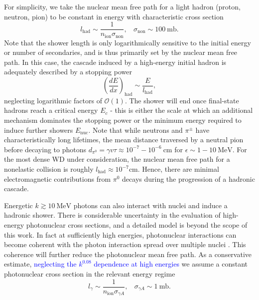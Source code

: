 \documentclass[twocolumn,showpacs,preprintnumbers,amsmath,amssymb,prd]{revtex4}
\newcommand{\OO}{\mathcal{O}}
\def\r{\right)}
\def\l{\left(}
\begin{document}
\begin{appendices}
For simplicity, we take the nuclear mean free path for a light hadron (proton, neutron, pion) to be constant in energy with characteristic cross section
\begin{equation}
l_\text{had} \sim  \frac{1}{n_\text{ion} \sigma_\text{non}}, ~~~~ \sigma_\text{non} \sim 100 ~\text{mb}.
\end{equation}
Note that the shower length is only logarithmically sensitive to the initial energy or number of secondaries, and is thus primarily set by the nuclear mean free path.
In this case, the cascade induced by a high-energy initial hadron is adequately described by a stopping power
\begin{equation}
\label{eq:nucshower}
\l \frac{dE}{dx}\r_\text{had} \sim \frac{E}{l_\text{had}},
\end{equation}
neglecting logarithmic factors of $\OO(1)$.
The shower will end once final-state hadrons reach a critical energy $E_c$ - this is either the scale at which an additional mechanism dominates the stopping power or the minimum energy required to induce further showers $E_\text{nuc}$.
Note that while neutrons and $\pi^\pm$ have characteristically long lifetimes, the mean distance traversed by a neutral pion before decaying to photons $d_{\pi^0} = \gamma v \tau \approx 10^{-7} - 10^{-6} ~\text{cm}$ for $\epsilon \sim 1 - 10 ~\text{MeV}$.
For the most dense WD under consideration, the nuclear mean free path for a nonelastic collision is roughly $l_\text{had} \approx 10^{-7} \text{cm}$.
Hence, there are minimal electromagnetic contributions from $\pi^0$ decays during the progression of a hadronic cascade.

Energetic $k \gtrsim 10 ~\text{MeV}$ photons can also interact with nuclei and induce a hadronic shower.
There is considerable uncertainty in the evaluation of high-energy photonuclear cross sections, and a detailed model is beyond the scope of this work.
In fact at sufficiently high energies, photonuclear interactions can become coherent with the photon interaction spread over multiple nuclei \cite{Gerhardt:2010bj}.
This coherence will further reduce the photonuclear mean free path.
As a conservative estimate, \textcolor{blue}{neglecting the $k^{0.08}$ dependence at high energies} we assume a constant photonuclear cross section in the relevant energy regime
\begin{equation}
l_\gamma \sim \frac{1}{n_\text{ion} \sigma_{\gamma A}}, ~~~~ \sigma_{\gamma A} \sim 1 ~\text{mb}.
\end{equation}


\end{appendices}
\end{document}
